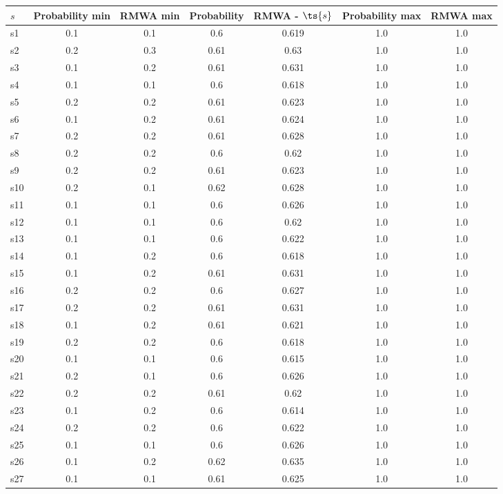 \documentclass{article}
\begin{document}
\noindent\begin{tabular}{|l|c|c|c|c|c|c|}
\hline
$s$& Probability min & RMWA min & Probability & RMWA - $\ts{s}$ & Probability max & RMWA max\\
\hline
s1 &0.1 & 0.1 & 0.6 & 0.619 & 1.0 & 1.0\\
\hline
s2 &0.2 & 0.3 & 0.61 & 0.63 & 1.0 & 1.0\\
\hline
s3 &0.1 & 0.2 & 0.61 & 0.631 & 1.0 & 1.0\\
\hline
s4 &0.1 & 0.1 & 0.6 & 0.618 & 1.0 & 1.0\\
\hline
s5 &0.2 & 0.2 & 0.61 & 0.623 & 1.0 & 1.0\\
\hline
s6 &0.1 & 0.2 & 0.61 & 0.624 & 1.0 & 1.0\\
\hline
s7 &0.2 & 0.2 & 0.61 & 0.628 & 1.0 & 1.0\\
\hline
s8 &0.2 & 0.2 & 0.6 & 0.62 & 1.0 & 1.0\\
\hline
s9 &0.2 & 0.2 & 0.61 & 0.623 & 1.0 & 1.0\\
\hline
s10 &0.2 & 0.1 & 0.62 & 0.628 & 1.0 & 1.0\\
\hline
s11 &0.1 & 0.1 & 0.6 & 0.626 & 1.0 & 1.0\\
\hline
s12 &0.1 & 0.1 & 0.6 & 0.62 & 1.0 & 1.0\\
\hline
s13 &0.1 & 0.1 & 0.6 & 0.622 & 1.0 & 1.0\\
\hline
s14 &0.1 & 0.2 & 0.6 & 0.618 & 1.0 & 1.0\\
\hline
s15 &0.1 & 0.2 & 0.61 & 0.631 & 1.0 & 1.0\\
\hline
s16 &0.2 & 0.2 & 0.6 & 0.627 & 1.0 & 1.0\\
\hline
s17 &0.2 & 0.2 & 0.61 & 0.631 & 1.0 & 1.0\\
\hline
s18 &0.1 & 0.2 & 0.61 & 0.621 & 1.0 & 1.0\\
\hline
s19 &0.2 & 0.2 & 0.6 & 0.618 & 1.0 & 1.0\\
\hline
s20 &0.1 & 0.1 & 0.6 & 0.615 & 1.0 & 1.0\\
\hline
s21 &0.2 & 0.1 & 0.6 & 0.626 & 1.0 & 1.0\\
\hline
s22 &0.2 & 0.2 & 0.61 & 0.62 & 1.0 & 1.0\\
\hline
s23 &0.1 & 0.2 & 0.6 & 0.614 & 1.0 & 1.0\\
\hline
s24 &0.2 & 0.2 & 0.6 & 0.622 & 1.0 & 1.0\\
\hline
s25 &0.1 & 0.1 & 0.6 & 0.626 & 1.0 & 1.0\\
\hline
s26 &0.1 & 0.2 & 0.62 & 0.635 & 1.0 & 1.0\\
\hline
s27 &0.1 & 0.1 & 0.61 & 0.625 & 1.0 & 1.0\\

\end{tabular}
\end{document}
